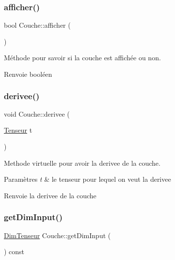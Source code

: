 \subsubsection{\texorpdfstring{afficher()}{afficher()}}
{\footnotesize\ttfamily bool Couche\+::afficher (\begin{DoxyParamCaption}{ }\end{DoxyParamCaption})\hspace{0.3cm}{\ttfamily [virtual]}}



Méthode pour savoir si la couche est affichée ou non. 

\begin{DoxyReturn}{Renvoie}
booléen 
\end{DoxyReturn}
\mbox{\label{classCouche_acfb65d035c2070d65b699508b7333bb3}} 
\subsubsection{\texorpdfstring{derivee()}{derivee()}}
{\footnotesize\ttfamily void Couche\+::derivee (\begin{DoxyParamCaption}\item[{\hyperlink{classTenseur}{Tenseur}}]{t }\end{DoxyParamCaption})\hspace{0.3cm}{\ttfamily [virtual]}}



Methode virtuelle pour avoir la derivee de la couche. 


\begin{DoxyParams}{Paramètres}
{\em t} & le tenseur pour lequel on veut la derivee \\
\hline
\end{DoxyParams}
\begin{DoxyReturn}{Renvoie}
la derivee de la couche 
\end{DoxyReturn}
\mbox{\label{classCouche_a4f3e4fe4a84f2dfcbee4bda6e20bdc03}} 
\subsubsection{\texorpdfstring{get\+Dim\+Input()}{getDimInput()}}
{\footnotesize\ttfamily \hyperlink{classDimTenseur}{Dim\+Tenseur} Couche\+::get\+Dim\+Input (\begin{DoxyParamCaption}{ }\end{DoxyParamCaption}) const}




